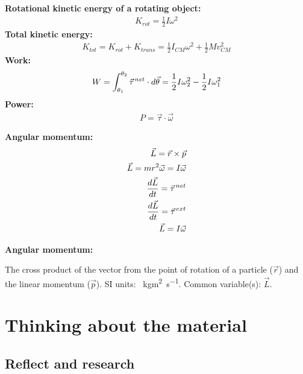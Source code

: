 \newpage
\begin{importantEquations}
\medskip
\begin{multicols}{2}
\textbf{Rotational kinetic energy of a rotating object:}
\begin{align*}
K_{rot} = \frac{1}{2}I\omega^2
\end{align*}
\textbf{Total kinetic energy:}
\begin{align*}
K_{tot} = K_{rot} + K_{trans} = \frac{1}{2}I_{CM}\omega^2+ \frac{1}{2}Mv_{CM}^2
\end{align*}
\textbf{Work:}
\begin{align*}
W = \int_{\theta_1}^{\theta_2}\pvec \tau^{net}\cdot d\vec \theta = \frac{1}{2}I\omega_2^2 -\frac{1}{2}I\omega_1^2
\end{align*}
\textbf{Power:}
\begin{align*}
P = \vec \tau \cdot \vec \omega
\end{align*}
\columnbreak

\textbf{Angular momentum:}
\begin{align*}
\vec L = \vec r \times \vec p\\
\vec L = mr^2\vec\omega = I\vec\omega\\
\frac{d\vec L}{dt}=\pvec\tau^{net}\\
\frac{d\vec L}{dt}=\pvec\tau^{ext}\\
\vec L = I\vec \omega\\
\end{align*}
\medskip
\end{multicols}
\end{importantEquations}

\begin{definitions}
	
	\textbf{Angular momentum:}
	\item The cross product of the vector from the point of rotation of a particle ($\vec r$) and the linear momentum ($\vec p$). SI units: \SI{}{kgm^2s^{-1}}. Common variable(s): $\vec L$.
	\medskip
	
\end{definitions}


\newpage
\section{Thinking about the material}
\subsection{Reflect and research}

